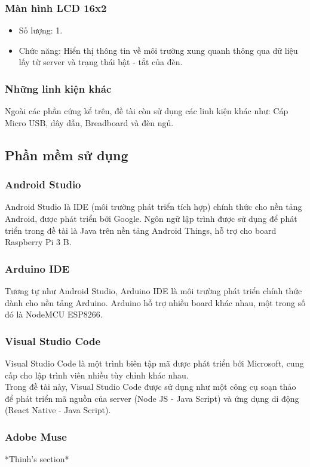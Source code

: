 \documentclass[12pt,titlepage,a4paper]{article}
\begin{document}
\subsubsection{Màn hình LCD 16x2}
\begin{itemize}
\item Số lượng: 1.
\item Chức năng: Hiển thị thông tin về môi trường xung quanh thông qua dữ liệu lấy từ server và trạng thái bật - tắt của đèn.
\end{itemize}
\subsubsection{Những linh kiện khác}
Ngoài các phần cứng kể trên, đề tài còn sử dụng các linh kiện khác như: Cáp Micro USB, dây dẫn, Breadboard và đèn ngủ.

\subsection{Phần mềm sử dụng}
\subsubsection{Android Studio}
Android Studio là IDE (môi trường phát triển tích hợp) chính thức cho nền tảng Android, được phát triển bởi Google. Ngôn ngữ lập trình được sử dụng để phát triển trong đề tài là Java trên nền tảng Android Things, hỗ trợ cho board Raspberry Pi 3 B.
\subsubsection{Arduino IDE}
Tương tự như Android Studio, Arduino IDE là môi trường phát triển chính thức dành cho nền tảng Arduino. Arduino hỗ trợ nhiều board khác nhau, một trong số đó là NodeMCU ESP8266.
\subsubsection{Visual Studio Code}
Visual Studio Code là một trình biên tập mã được phát triển bởi Microsoft, cung cấp cho lập trình viên nhiều tùy chỉnh khác nhau.
\\
Trong đề tài này, Visual Studio Code được sử dụng như một công cụ soạn thảo để phát triển mã nguồn của server (Node JS - Java Script) và ứng dụng di động (React Native - Java Script).
\subsubsection{Adobe Muse}
*Thinh's section*
\end{document}

